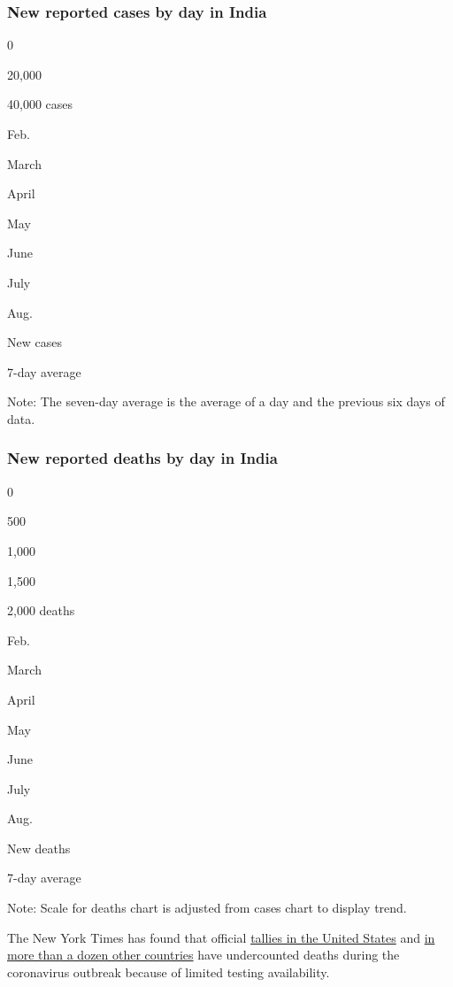 \hypertarget{new-reported-cases-by-day-in-india}{%
\subsubsection{New reported cases by day in
India}\label{new-reported-cases-by-day-in-india}}

0

20,000

40,000 cases

Feb.

March

April

May

June

July

Aug.

New cases

7-day average

Note: The seven-day average is the average of a day and the previous six
days of data.

\hypertarget{new-reported-deaths-by-day-in-india}{%
\subsubsection{New reported deaths by day in
India}\label{new-reported-deaths-by-day-in-india}}

0

500

1,000

1,500

2,000 deaths

Feb.

March

April

May

June

July

Aug.

New deaths

7-day average

Note: Scale for deaths chart is adjusted from cases chart to display
trend.

The New York Times has found that official
\href{https://www.nytimes3xbfgragh.onion/interactive/2020/04/28/us/coronavirus-death-toll-total.html}{tallies
in the United States} and
\href{https://www.nytimes3xbfgragh.onion/interactive/2020/04/21/world/coronavirus-missing-deaths.html}{in
more than a dozen other countries} have undercounted deaths during the
coronavirus outbreak because of limited testing availability.

